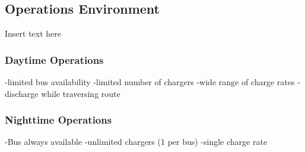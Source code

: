 \subsection{Operations Environment}
Insert text here
\subsubsection{Daytime Operations}
-limited bus availability
-limited number of chargers
-wide range of charge rates
-discharge while traversing route
\subsubsection{Nighttime Operations}
-Bus always available
-unlimited chargers (1 per bus)
-single charge rate
